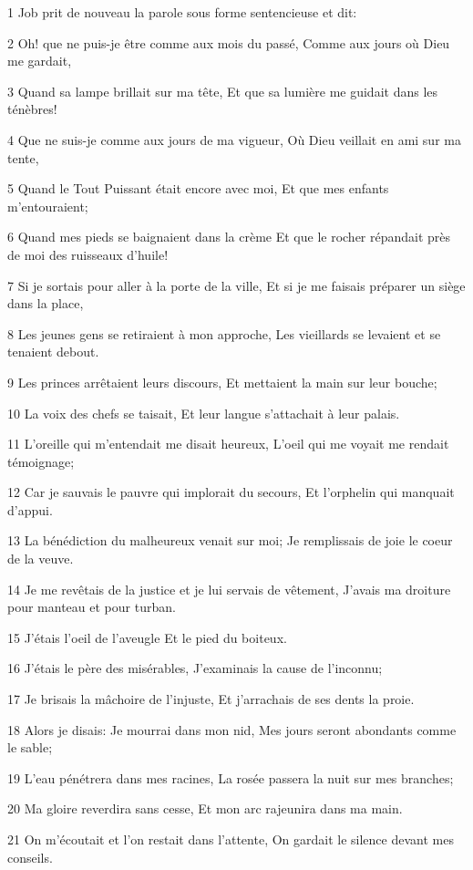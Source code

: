\par 1 Job prit de nouveau la parole sous forme sentencieuse et dit:
\par 2 Oh! que ne puis-je être comme aux mois du passé, Comme aux jours où Dieu me gardait,
\par 3 Quand sa lampe brillait sur ma tête, Et que sa lumière me guidait dans les ténèbres!
\par 4 Que ne suis-je comme aux jours de ma vigueur, Où Dieu veillait en ami sur ma tente,
\par 5 Quand le Tout Puissant était encore avec moi, Et que mes enfants m'entouraient;
\par 6 Quand mes pieds se baignaient dans la crème Et que le rocher répandait près de moi des ruisseaux d'huile!
\par 7 Si je sortais pour aller à la porte de la ville, Et si je me faisais préparer un siège dans la place,
\par 8 Les jeunes gens se retiraient à mon approche, Les vieillards se levaient et se tenaient debout.
\par 9 Les princes arrêtaient leurs discours, Et mettaient la main sur leur bouche;
\par 10 La voix des chefs se taisait, Et leur langue s'attachait à leur palais.
\par 11 L'oreille qui m'entendait me disait heureux, L'oeil qui me voyait me rendait témoignage;
\par 12 Car je sauvais le pauvre qui implorait du secours, Et l'orphelin qui manquait d'appui.
\par 13 La bénédiction du malheureux venait sur moi; Je remplissais de joie le coeur de la veuve.
\par 14 Je me revêtais de la justice et je lui servais de vêtement, J'avais ma droiture pour manteau et pour turban.
\par 15 J'étais l'oeil de l'aveugle Et le pied du boiteux.
\par 16 J'étais le père des misérables, J'examinais la cause de l'inconnu;
\par 17 Je brisais la mâchoire de l'injuste, Et j'arrachais de ses dents la proie.
\par 18 Alors je disais: Je mourrai dans mon nid, Mes jours seront abondants comme le sable;
\par 19 L'eau pénétrera dans mes racines, La rosée passera la nuit sur mes branches;
\par 20 Ma gloire reverdira sans cesse, Et mon arc rajeunira dans ma main.
\par 21 On m'écoutait et l'on restait dans l'attente, On gardait le silence devant mes conseils.
